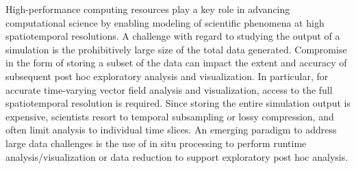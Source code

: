 %
%
%
%
High-performance computing resources play a key role in advancing computational science by enabling modeling of scientific phenomena at high spatiotemporal resolutions.
%
%
A challenge with regard to studying the output of a simulation is the prohibitively large size of the total data generated.
%
Compromise in the form of storing a subset of the data can impact the extent and accuracy of subsequent post hoc exploratory analysis and visualization.
%
In particular, for accurate time-varying vector field analysis and visualization, access to the full spatiotemporal resolution is required.
%
Since storing the entire simulation output is expensive, scientists resort to temporal subsampling or lossy compression, and often limit analysis to individual time slices.
%
An emerging paradigm to address large data challenges is the use of in situ processing to perform runtime analysis/visualization or data reduction to support exploratory post hoc analysis.
%
%


